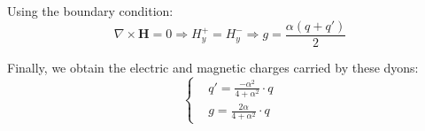 Using the boundary condition:
\begin{equation}
\nabla \times \bm{H} = 0 \Rightarrow H_y^+ = H_y^- \Rightarrow g = \frac{\alpha(q+q')}{2}
\end{equation}

Finally, we obtain the electric and magnetic charges carried by these dyons:
\begin{equation}
\left\{
\begin{aligned}
&q' = \frac{-\alpha^2}{4+\alpha^2} \cdot q \\
&g = \frac{2\alpha}{4+\alpha^2} \cdot q
\end{aligned}
\right.
\end{equation}